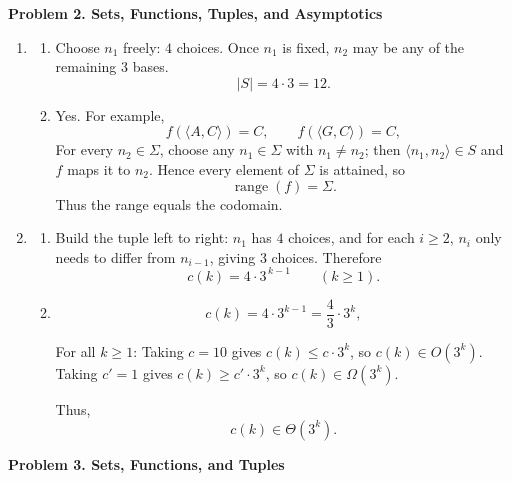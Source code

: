 \documentclass[12pt]{article}
\begin{document}
\vspace{1em}


\textbf{Problem 2. Sets, Functions, Tuples, and Asymptotics}

\begin{enumerate}
    \item [(a)]
    \begin{enumerate}
        \item [i.]
        Choose $n_1$ freely: $4$ choices. Once $n_1$ is fixed, $n_2$ may be any of the remaining
        $3$ bases.
        \[
        |S|=4\cdot 3=12.
        \]
        \item[ii.] 
        Yes. For example,
        \[
        f(\langle A,C\rangle)=C,\qquad f(\langle G,C\rangle)=C,
        \]
        For every $n_2\in\Sigma$, choose any $n_1\in\Sigma$ with $n_1\neq n_2$; then
        $\langle n_1,n_2\rangle\in S$ and $f$ maps it to $n_2$. Hence every element of
        $\Sigma$ is attained, so
        \[
        \operatorname{range}(f)=\Sigma.
        \]
        Thus the range equals the codomain.
    \end{enumerate}
    \item[(b)]
    \begin{enumerate}
        \item [i.]
        Build the tuple left to right: $n_1$ has $4$ choices, and for each $i\ge 2$, $n_i$
        only needs to differ from $n_{i-1}$, giving 3 choices.
        Therefore
        \[
        {c(k)=4\cdot 3^{\,k-1}\qquad (k\ge 1).}
        \]
        
        \item[ii.]
        \[
        c(k)=4\cdot 3^{k-1}=\frac{4}{3}\cdot 3^k,
        \]
        
        For all $k\ge 1$:
        Taking $c=10$ gives $c(k)\le c\cdot 3^k$, so $c(k)\in O(3^k)$.
        Taking $c'=1$ gives $c(k)\ge c'\cdot 3^k$, so $c(k)\in\Omega(3^k)$.
        
        Thus,
        \[
        {c(k)\in\Theta(3^k).}
        \]
    \end{enumerate}
\end{enumerate}

\textbf{Problem 3. Sets, Functions, and Tuples}
\end{document}
